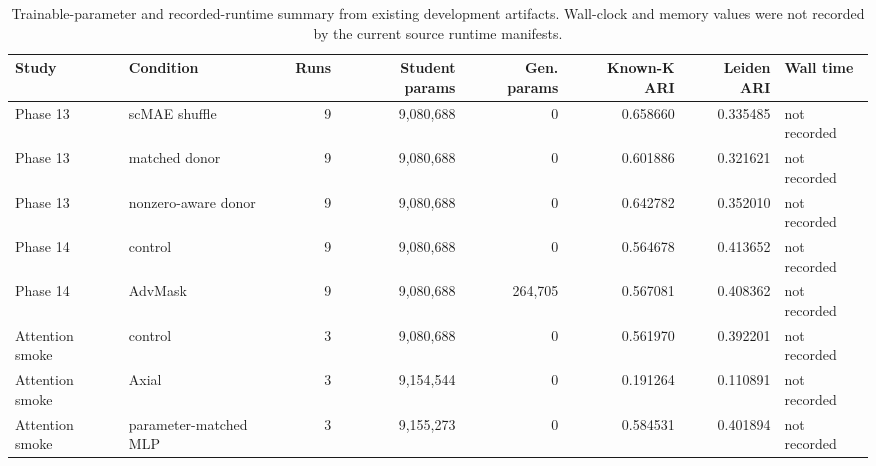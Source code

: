 \begin{table}[ht]
\centering
\caption{Trainable-parameter and recorded-runtime summary from existing development artifacts. Wall-clock and memory values were not recorded by the current source runtime manifests.}
\label{tab:generated-resource-summary}
\scriptsize
\begin{tabular}{llrrrrrl}
\toprule
Study & Condition & Runs & Student params & Gen. params & Known-K ARI & Leiden ARI & Wall time \\
\midrule
Phase 13 & scMAE shuffle & 9 & 9,080,688 & 0 & 0.658660 & 0.335485 & not recorded \\
Phase 13 & matched donor & 9 & 9,080,688 & 0 & 0.601886 & 0.321621 & not recorded \\
Phase 13 & nonzero-aware donor & 9 & 9,080,688 & 0 & 0.642782 & 0.352010 & not recorded \\
Phase 14 & control & 9 & 9,080,688 & 0 & 0.564678 & 0.413652 & not recorded \\
Phase 14 & AdvMask & 9 & 9,080,688 & 264,705 & 0.567081 & 0.408362 & not recorded \\
Attention smoke & control & 3 & 9,080,688 & 0 & 0.561970 & 0.392201 & not recorded \\
Attention smoke & Axial & 3 & 9,154,544 & 0 & 0.191264 & 0.110891 & not recorded \\
Attention smoke & parameter-matched MLP & 3 & 9,155,273 & 0 & 0.584531 & 0.401894 & not recorded \\
\bottomrule
\end{tabular}
\end{table}
